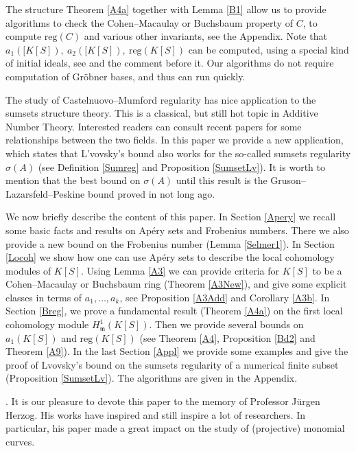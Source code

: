 \documentclass[11pt]{article}
\def\reg{\mathrm{reg}}
\def\mfr{{\frak m}}
\def\mfr{{\mathfrak m}}
\theoremstyle{remark}
\theoremstyle{definition}
\begin{document}
The structure Theorem \ref{A4a} together with  Lemma \ref{B1} allow us to  provide  algorithms to check the Cohen--Macaulay or Buchsbaum property of $C$,  to compute $\reg(C)$  and various other invariants, see the Appendix. Note that $a_1([K[S]), \ a_2([K[S]),\  \reg(K[S])$ can be  computed, using a special kind of initial ideals, see \cite[Example 4.3]{BGi} and the comment before it. Our algorithms do not require computation of Gr\"obner bases, and thus can run quickly.

The study of Castelnuovo--Mumford regularity has nice application to the sumsets structure theory. This is  a classical, but still hot topic in Additive Number Theory. Interested readers can consult recent papers \cite{El, GS} for some relationships between the two fields. In this paper we provide a new application, which states  that L'vovsky's bound also works for the so-called sumsets regularity $\sigma(A)$ (see Definition \ref{Sumreg} and Proposition \ref{SumsetLv}). It is worth to mention that the best bound on $\sigma(A)$ until this result is the Gruson--Lazarsfeld--Peskine bound  proved in \cite{GW} not long ago.

We now briefly describe the content of this paper. In Section \ref{Apery} we recall some basic facts and results on Ap\'ery sets and  Frobenius numbers. There we also provide a new bound on the Frobenius number (Lemma \ref{Selmer1}). In Section \ref{Locoh} we show how one can use Ap\'ery sets to describe the local cohomology modules of $K[S]$.  Using  Lemma \ref{A3} we can provide criteria for $K[S]$ to be a Cohen--Macaulay or Buchsbaum ring (Theorem \ref{A3New}), and give some explicit classes in terms of $a_1,\ldots,a_k$, see Proposition \ref{A3Add} and Corollary \ref{A3b}. In Section \ref{Breg}, we prove a fundamental result (Theorem \ref{A4a}) on the first local cohomology module $H^1_{\mfr}(K[S])$. Then we provide several bounds on $a_1(K[S])$ and $\reg(K[S])$ (see Theorem \ref{A4}, Proposition \ref{Bd2} and Theorem \ref{A9}). In the last Section \ref{Appl} we provide some examples and give the proof of Lvovsky's bound on the sumsets regularity of a numerical finite subset (Proposition \ref{SumsetLv}). The algorithms are given in the Appendix.

\vskip0.5cm
.  It is our pleasure to devote this paper to the memory of Professor J\"urgen Herzog. His works have inspired and still inspire a lot of researchers. In particular, his paper  \cite{He} made a great impact on  the study of (projective) monomial curves.
\end{document}
